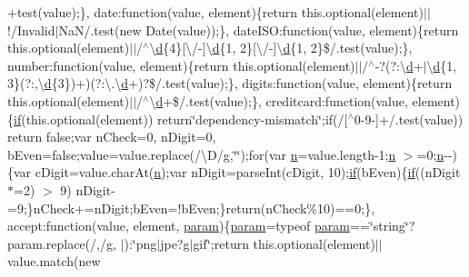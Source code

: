 \begin{DoxyCompactItemize}
+test(value);\}, date\+:function(value, element)\{return this.\+optional(element)$\vert$$\vert$!/Invalid$\vert$NaN/.test(new Date(value));\}, date\+I\+S\+O\+:function(value, element)\{return this.\+optional(element)$\vert$$\vert$/$^\wedge$\textbackslash{}\hyperlink{_scripts_2respond_8min_8js_aeb337d295abaddb5ec3cb34cc2e2bbc9}{d}\{4\}\mbox{[}\textbackslash{}/-\/\mbox{]}\textbackslash{}\hyperlink{_scripts_2respond_8min_8js_aeb337d295abaddb5ec3cb34cc2e2bbc9}{d}\{1, 2\}\mbox{[}\textbackslash{}/-\/\mbox{]}\textbackslash{}\hyperlink{_scripts_2respond_8min_8js_aeb337d295abaddb5ec3cb34cc2e2bbc9}{d}\{1, 2\}\$/.test(value);\}, number\+:function(value, element)\{return this.\+optional(element)$\vert$$\vert$/$^\wedge$-\/?(?\+:\textbackslash{}\hyperlink{_scripts_2respond_8min_8js_aeb337d295abaddb5ec3cb34cc2e2bbc9}{d}+$\vert$\textbackslash{}\hyperlink{_scripts_2respond_8min_8js_aeb337d295abaddb5ec3cb34cc2e2bbc9}{d}\{1, 3\}(?\+:,\textbackslash{}\hyperlink{_scripts_2respond_8min_8js_aeb337d295abaddb5ec3cb34cc2e2bbc9}{d}\{3\})+)(?\+:\textbackslash{}.\textbackslash{}\hyperlink{_scripts_2respond_8min_8js_aeb337d295abaddb5ec3cb34cc2e2bbc9}{d}+)?\$/.test(value);\}, digits\+:function(value, element)\{return this.\+optional(element)$\vert$$\vert$/$^\wedge$\textbackslash{}\hyperlink{_scripts_2respond_8min_8js_aeb337d295abaddb5ec3cb34cc2e2bbc9}{d}+\$/.test(value);\},   creditcard\+:function(value, element)\{\hyperlink{_scripts_2respond_8min_8js_a93851d60dd037a83509a1757b9ee7b66}{if}(this.\+optional(element)) return\char`\"{}dependency-\/mismatch\char`\"{};if(/\mbox{[}$^\wedge$0-\/9-\/\mbox{]}+/.test(value)) return false;var n\+Check=0, n\+Digit=0, b\+Even=false;value=value.\+replace(/\textbackslash{}D/\hyperlink{_scripts_2respond_8min_8js_a103df269476e78897c9c4c6cb8f4eb06}{g},\char`\"{}\char`\"{});for(var \hyperlink{_scripts_2ai_80_822_89-build00167_8min_8js_afc984c4f6c68ce30a0af99006f5f8d27}{n}=value.\+length-\/1;\hyperlink{_scripts_2ai_80_822_89-build00167_8min_8js_afc984c4f6c68ce30a0af99006f5f8d27}{n} $>$=0;\hyperlink{_scripts_2ai_80_822_89-build00167_8min_8js_afc984c4f6c68ce30a0af99006f5f8d27}{n}-\/-\/)\{var c\+Digit=value.\+char\+At(\hyperlink{_scripts_2ai_80_822_89-build00167_8min_8js_afc984c4f6c68ce30a0af99006f5f8d27}{n});var n\+Digit=parse\+Int(c\+Digit, 10);\hyperlink{_scripts_2respond_8min_8js_a93851d60dd037a83509a1757b9ee7b66}{if}(b\+Even)\{\hyperlink{_scripts_2respond_8min_8js_a93851d60dd037a83509a1757b9ee7b66}{if}((n\+Digit $\ast$=2) $>$ 9) n\+Digit-\/=9;\}n\+Check+=n\+Digit;b\+Even=!b\+Even;\}return(n\+Check\%10)==0;\}, accept\+:function(value, element, \hyperlink{_scripts_2jquery-1_810_82_8min_8js_ae8915303d11557d1b001bc56b6195251}{param})\{\hyperlink{_scripts_2jquery-1_810_82_8min_8js_ae8915303d11557d1b001bc56b6195251}{param}=typeof \hyperlink{_scripts_2jquery-1_810_82_8min_8js_ae8915303d11557d1b001bc56b6195251}{param}==\char`\"{}string\char`\"{}?param.\+replace(/,/\hyperlink{_scripts_2respond_8min_8js_a103df269476e78897c9c4c6cb8f4eb06}{g}, \textquotesingle{}$\vert$\textquotesingle{})\+:\char`\"{}png$\vert$jpe?\hyperlink{_scripts_2respond_8min_8js_a103df269476e78897c9c4c6cb8f4eb06}{g}$\vert$gif\char`\"{};return this.\+optional(element)$\vert$$\vert$value.\+match(new 
\end{DoxyCompactItemize}
